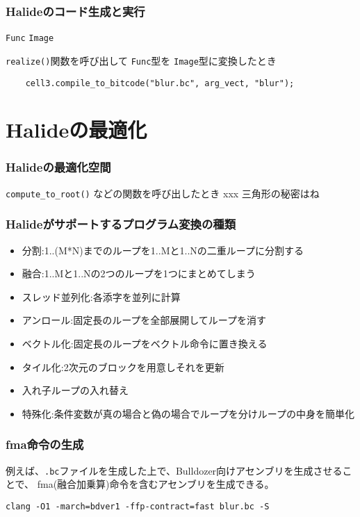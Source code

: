 \documentclass[dvipdfmx,cjk]{beamer}
\begin{document}
\begin{frame}[fragile]\frametitle{Halideのコード生成と実行}

{\tt Func}
{\tt Image}

{\tt realize()}関数を呼び出して
{\tt Func}型を
{\tt Image}型に変換したとき

\begingroup
    \fontsize{9pt}{10pt}\selectfont
\begin{verbatim}
    cell3.compile_to_bitcode("blur.bc", arg_vect, "blur");
\end{verbatim}
\endgroup

\end{frame}


\section{Halideの最適化} 
\begin{frame}\frametitle{Halideの最適化空間}
{\tt compute\_to\_root()} などの関数を呼び出したとき
xxx 三角形の秘密はね
\end{frame}


\begin{frame}\frametitle{Halideがサポートするプログラム変換の種類}
\begin{itemize}
  \item 分割:1..(M*N)までのループを1..Mと1..Nの二重ループに分割する
  \item 融合:1..Mと1..Nの2つのループを1つにまとめてしまう
  \item スレッド並列化:各添字を並列に計算
  \item アンロール:固定長のループを全部展開してループを消す
  \item ベクトル化:固定長のループをベクトル命令に置き換える
  \item タイル化:2次元のブロックを用意しそれを更新
  \item 入れ子ループの入れ替え
  \item 特殊化:条件変数が真の場合と偽の場合でループを分けループの中身を簡単化
\end{itemize}
\end{frame}

\begin{frame}[fragile]\frametitle{fma命令の生成}

例えば、{\tt .bc}ファイルを生成した上で、Bulldozer向けアセンブリを生成させることで、
fma(融合加乗算)命令を含むアセンブリを生成できる。
\begingroup
    \fontsize{8pt}{9pt}\selectfont
\begin{verbatim}
clang -O1 -march=bdver1 -ffp-contract=fast blur.bc -S
\end{verbatim}
\endgroup
\vspace{-1cm}


\end{frame}
\end{document}
